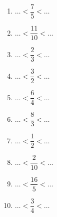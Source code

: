 \documentclass[9pt]{article}
\begin{document}
\begin{multicols}{2}
\begin{exercice}
\begin{multicols}{2}
\begin{enumerate}
	\item \begin{minipage}[t]{\linewidth} $\ldots < \dfrac{7}{5} < \ldots$ \end{minipage}
	\item \begin{minipage}[t]{\linewidth} $\ldots < \dfrac{11}{10} < \ldots$ \end{minipage}
	\item \begin{minipage}[t]{\linewidth} $\ldots < \dfrac{2}{3} < \ldots$ \end{minipage}
	\item \begin{minipage}[t]{\linewidth} $\ldots < \dfrac{3}{2} < \ldots$ \end{minipage}
	\item \begin{minipage}[t]{\linewidth} $\ldots < \dfrac{6}{4} < \ldots$ \end{minipage}
	\item \begin{minipage}[t]{\linewidth} $\ldots < \dfrac{8}{3} < \ldots$ \end{minipage}
	\item \begin{minipage}[t]{\linewidth} $\ldots < \dfrac{1}{2} < \ldots$ \end{minipage}
	\item \begin{minipage}[t]{\linewidth} $\ldots < \dfrac{2}{10} < \ldots$ \end{minipage}
	\item \begin{minipage}[t]{\linewidth} $\ldots < \dfrac{16}{5} < \ldots$ \end{minipage}
	\item \begin{minipage}[t]{\linewidth} $\ldots < \dfrac{3}{4} < \ldots$ \end{minipage}
\end{enumerate}
\end{multicols}
\end{exercice}
\end{multicols}
\end{document}
